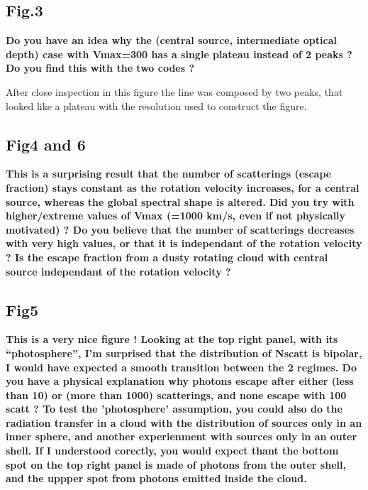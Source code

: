 \documentclass[12pt]{article}
\begin{document}
\subsection*{Fig.3}

{\bf Do you have an idea why the (central source, intermediate optical depth) case with Vmax=300 has a single plateau instead of 2 peaks ? Do you find this with the two codes ?}

After close inspection in this figure the line was composed by two
peaks, that looked like a plateau with the resolution used to
construct the figure.


\subsection*{Fig4 and 6}

{\bf This is a surprising result that the number of scatterings (escape fraction) stays constant as the rotation velocity increases, for a central source, whereas the global spectral shape is altered. Did you try with higher/extreme values of Vmax (=1000 km/s, even if not physically motivated) ? Do you believe that the number of scatterings decreases with very high values, or that it is independant of the rotation velocity ? Is the escape fraction from a dusty rotating cloud with central source independant of the rotation velocity ?}



\subsection*{Fig5}

{\bf This is a very nice figure ! Looking at the top right panel, with
  its “photosphere”, I’m surprised that the distribution of Nscatt is
  bipolar, I would have expected a smooth transition between the 2
  regimes. Do you have a physical explanation why photons escape after
  either (less than 10) or (more than 1000) scatterings, and none
  escape with 100 scatt ? To test the ’photosphere’ assumption, you
  could also do the radiation transfer in a cloud with the
  distribution of sources only in an inner sphere, and another
  experienment with sources only in an outer shell. If I understood
  corectly, you would expect thant the bottom spot on the top right
  panel is made of photons from the outer shell, and the uppper spot
  from photons emitted inside the cloud.} 
\end{document}
